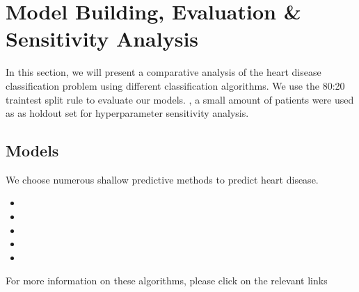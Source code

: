 \documentclass[letterpaper,10pt,english]{jupyterBook}
\begin{document}
\chapter{Model Building, Evaluation \& Sensitivity Analysis}
\label{\detokenize{Model_evaluation:model-building-evaluation-sensitivity-analysis}}\label{\detokenize{Model_evaluation::doc}}
\sphinxAtStartPar
In this section, we will present a comparative analysis of the heart disease classification problem using different classification algorithms. We use the 80:20 train\sphinxhyphen{}test split rule to evaluate our models.
, a small amount of patients were used as  as hold\sphinxhyphen{}out set for hyper\sphinxhyphen{}parameter sensitivity analysis.


\section{Models}
\label{\detokenize{Model_evaluation:models}}
\sphinxAtStartPar
We choose numerous shallow predictive methods to predict heart disease.
\begin{itemize}
\item {} 
\sphinxAtStartPar
{}

\item {} 
\sphinxAtStartPar
{}

\item {} 
\sphinxAtStartPar
{}

\item {} 
\sphinxAtStartPar
{}

\item {} 
\sphinxAtStartPar
{}

\end{itemize}

\sphinxAtStartPar
For more information on these algorithms, please click on the relevant links
\end{document}
